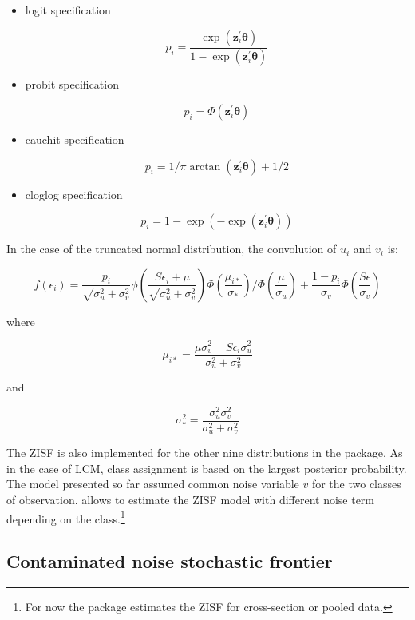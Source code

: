 \documentclass[nojss]{jss}
\begin{document}
\begin{itemize} \itemsep 12pt
\item logit specification

$$p_i = \frac{\exp{(\mathbf{z}_{i}^{\prime}\bm{\theta})}}{1-
\exp{(\mathbf{z}_{i}^{\prime}\bm{\theta})}}$$

\item probit specification

$$p_i = \Phi\left(\mathbf{z}_{i}^{\prime}\bm{\theta}\right)$$

\item cauchit specification

$$p_i = 1/\pi\arctan(\mathbf{z}_{i}^{\prime}\bm{\theta})+1/2$$

\item cloglog specification

$$p_i = 1-\exp\left(-\exp(\mathbf{z}_{i}^{\prime} \bm{\theta})\right)$$

\end{itemize}

In the case of the truncated normal distribution, the convolution of $u_i$ and 
$v_i$ is:

 $$f(\epsilon_i)=\frac{p_i}{\sqrt{\sigma_u^2 + 
 \sigma_v^2}}\phi\left(\frac{S\epsilon_i + \mu}{\sqrt{
 \sigma_u^2 + \sigma_v^2}}\right)\Phi\left(\frac{
 \mu_{i\ast}}{\sigma_\ast}\right)\Big/\Phi\left(
 \frac{\mu}{\sigma_u}\right) + \frac{1-p_i}{\sigma_v}
 \Phi\left(\frac{S\epsilon}{\sigma_v}\right)$$

 where

 $$\mu_{i*}=\frac{\mu\sigma_v^2 - 
 S\epsilon_i\sigma_u^2}{\sigma_u^2 + \sigma_v^2}$$

 and

 $$\sigma_*^2 = \frac{\sigma_u^2 
 \sigma_v^2}{\sigma_u^2 + \sigma_v^2}$$
 
 The ZISF is also implemented for the other nine distributions in the package.
 As in the case of LCM, class assignment is based on the largest posterior 
 probability. The model presented so far assumed common noise variable $v$ for 
 the two classes of observation.  allows to estimate the ZISF model
 with different noise term depending on the class.\footnote{For now the
  package estimates the ZISF for cross-section or pooled data.}

\subsection{Contaminated noise stochastic frontier}
\end{document}
